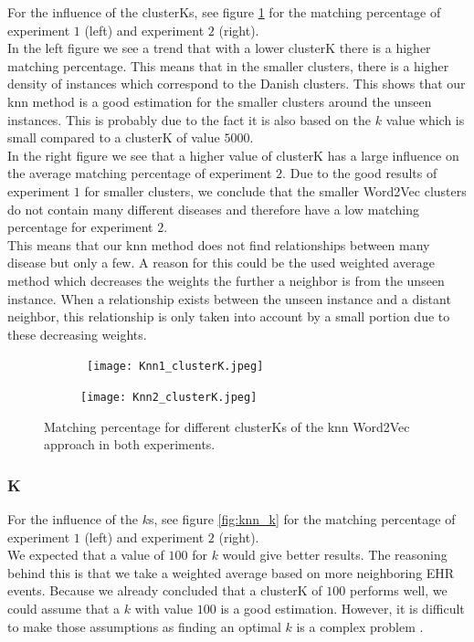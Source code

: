 For the influence of the clusterKs, see figure \ref{fig:knn_clusterK} for the matching percentage of experiment $1$ (left) and experiment $2$ (right). \\

In the left figure we see a trend that with a lower clusterK there is a higher matching percentage. This means that in the smaller clusters, there is a higher density of instances which correspond to the Danish clusters. This shows that our knn method is a good estimation for the smaller clusters around the unseen instances. This is probably due to the fact it is also based on the $k$ value which is small compared to a clusterK of value $5000$. \\

In the right figure we see that a higher value of clusterK has a large influence on the average matching percentage of experiment $2$. Due to the good results of experiment $1$ for smaller clusters, we conclude that the smaller Word2Vec clusters do not contain many different diseases and therefore have a low matching percentage for experiment $2$. \\
This means that our knn method does not find relationships between many disease but only a few. A reason for this could be the used weighted average method which decreases the weights the further a neighbor is from the unseen instance. When a relationship exists between the unseen instance and a distant neighbor, this relationship is only taken into account by a small portion due to these decreasing weights.

\begin{figure}[!htb]
	\centering
	\begin{subfigure}[b]{.49\textwidth}\
		\texttt{[image: Knn1\_clusterK.jpeg]}
	\end{subfigure}
	\begin{subfigure}[b]{.49\textwidth}
		\texttt{[image: Knn2\_clusterK.jpeg]}
	\end{subfigure}
	\caption{Matching percentage for different clusterKs of the knn Word2Vec 	approach in both experiments.}
	\label{fig:knn_clusterK}
\end{figure}

\subsubsection{K}

For the influence of the $k$s, see figure \ref{fig:knn_k} for the matching percentage of experiment $1$ (left) and experiment $2$ (right). \\
We expected that a value of $100$ for $k$ would give better results. The reasoning behind this is that we take a weighted average based on more neighboring EHR events. Because we already concluded that a clusterK of $100$ performs well, we could assume that a $k$ with value $100$ is a good estimation. However, it is difficult to make those assumptions as finding an optimal $k$ is a complex problem \cite{knnDifficult:article}. \\  

